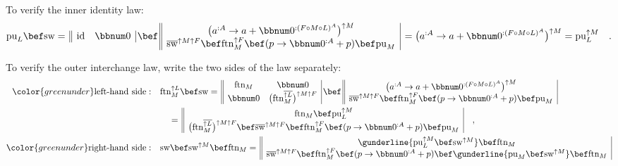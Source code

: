 To verify the inner identity law:
\[
\text{pu}_{L}\bef\text{sw}=\,\begin{array}{||cc|}
\text{id} & \bbnum 0\end{array}\,\bef\,\begin{array}{||c|}
\big(a^{:A}\rightarrow a+\bbnum 0^{:(F\circ M\circ L)^{A}}\big)^{\uparrow M}\\
\overline{\text{sw}}^{\uparrow M\uparrow F}\bef\text{ftn}_{M}^{\uparrow F}\bef(p\rightarrow\bbnum 0^{:A}+p)\bef\text{pu}_{M}
\end{array}\,=\big(a^{:A}\rightarrow a+\bbnum 0^{:(F\circ M\circ L)^{A}}\big)^{\uparrow M}=\text{pu}_{L}^{\uparrow M}\quad.
\]

To verify the outer interchange law, write the two sides of the law
separately:
\begin{align*}
{\color{greenunder}\text{left-hand side}:}\quad & \text{ftn}_{M}^{\uparrow L}\bef\text{sw}=\,\begin{array}{||cc|}
\text{ftn}_{M} & \bbnum 0\\
\bbnum 0 & \big(\text{ftn}_{M}^{\overline{\uparrow L}}\big)^{\uparrow M\uparrow F}
\end{array}\,\bef\,\begin{array}{||c|}
\big(a^{:A}\rightarrow a+\bbnum 0^{:(F\circ M\circ L)^{A}}\big)^{\uparrow M}\\
\overline{\text{sw}}^{\uparrow M\uparrow F}\bef\text{ftn}_{M}^{\uparrow F}\bef(p\rightarrow\bbnum 0^{:A}+p)\bef\text{pu}_{M}
\end{array}\\
 & \quad=\,\begin{array}{||c|}
\text{ftn}_{M}\bef\text{pu}_{L}^{\uparrow M}\\
\big(\text{ftn}_{M}^{\overline{\uparrow L}}\big)^{\uparrow M\uparrow F}\bef\overline{\text{sw}}^{\uparrow M\uparrow F}\bef\text{ftn}_{M}^{\uparrow F}\bef(p\rightarrow\bbnum 0^{:A}+p)\bef\text{pu}_{M}
\end{array}\quad,\\
{\color{greenunder}\text{right-hand side}:}\quad & \text{sw}\bef\text{sw}^{\uparrow M}\bef\text{ftn}_{M}=\,\begin{array}{||c|}
\gunderline{\text{pu}_{L}^{\uparrow M}\bef\text{sw}^{\uparrow M}}\bef\text{ftn}_{M}\\
\overline{\text{sw}}^{\uparrow M\uparrow F}\bef\text{ftn}_{M}^{\uparrow F}\bef(p\rightarrow\bbnum 0^{:A}+p)\bef\gunderline{\text{pu}_{M}\bef\text{sw}^{\uparrow M}}\bef\text{ftn}_{M}
\end{array}\\

\end{align*}
